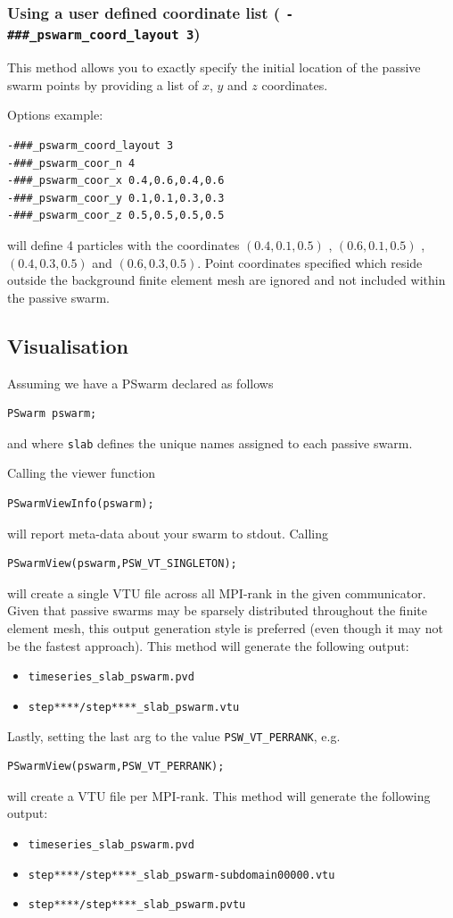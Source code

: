 \documentclass[paper=a4, fontsize=10pt,twoside]{scrartcl}
\begin{document}
{{\subsubsection{Using a user defined coordinate list ( \texttt{-\#\#\#\_pswarm\_coord\_layout 3})}

This method allows you to exactly specify the initial location of the passive swarm points by providing
a list of $x$, $y$ and $z$ coordinates.

Options example:
\begin{lstlisting}
-###_pswarm_coord_layout 3
-###_pswarm_coor_n 4
-###_pswarm_coor_x 0.4,0.6,0.4,0.6
-###_pswarm_coor_y 0.1,0.1,0.3,0.3
-###_pswarm_coor_z 0.5,0.5,0.5,0.5
\end{lstlisting}
will define 4 particles with the coordinates $(0.4,0.1,0.5)$ , $(0.6,0.1,0.5)$ , $(0.4,0.3,0.5)$ and $(0.6,0.3,0.5)$.
Point coordinates specified which reside outside the background finite element mesh are ignored and not included within the passive swarm.

\subsection{Visualisation}

Assuming we have a PSwarm declared as follows
\begin{lstlisting}
PSwarm pswarm;
\end{lstlisting}
and where \texttt{slab} defines the unique names assigned to each passive swarm.

Calling the viewer function
\begin{lstlisting}
PSwarmViewInfo(pswarm); 
\end{lstlisting}
will report meta-data about your swarm to stdout.
Calling 
\begin{lstlisting}
PSwarmView(pswarm,PSW_VT_SINGLETON);
\end{lstlisting}
will create a single VTU file across all MPI-rank in the given communicator. 
Given that passive swarms may be sparsely distributed throughout the finite element mesh,
this output generation style is preferred (even though it may not be the fastest approach).
This method will generate the following output:
\begin{itemize}
\item \texttt{timeseries\_slab\_pswarm.pvd}
\item \texttt{step****/step****\_slab\_pswarm.vtu}
\end{itemize}
Lastly, setting the last arg to the value \texttt{PSW\_VT\_PERRANK}, e.g.
\begin{lstlisting}
PSwarmView(pswarm,PSW_VT_PERRANK);
\end{lstlisting}
will create a VTU file per MPI-rank. 
This method will generate the following output:
\begin{itemize}
\item \texttt{timeseries\_slab\_pswarm.pvd}
\item \texttt{step****/step****\_slab\_pswarm-subdomain00000.vtu}
\item \texttt{step****/step****\_slab\_pswarm.pvtu}
\end{itemize}




}}
\end{document}
